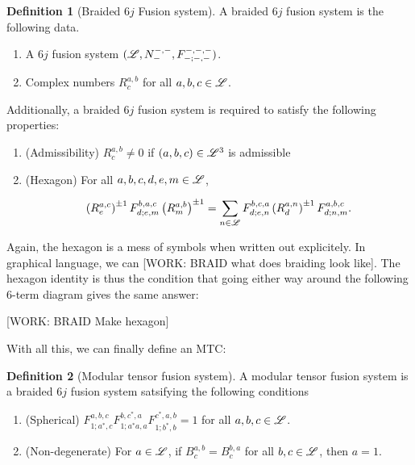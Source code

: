 \documentclass{article}
\theoremstyle{definition}
\newtheorem*{definition}{Definition}
\numberwithin{figure}{section}
\begin{document}
\begin{enumerate}[\thesection .1.]
\begin{definition}[Braided $6j$ Fusion system] A braided $6j$ fusion system is the following data.

\begin{enumerate}
\item A $6j$ fusion system $(\mathscr{L}, N_{\--}^{\--,\--},F^{\--,\--,\--}_{\--;\--,\--})$.
\item Complex numbers $R^{a,b}_{c}$ for all $a,b,c\in \mathscr{L}$.
\end{enumerate}

Additionally, a braided $6j$ fusion system is required to satisfy the following properties:

\begin{enumerate}

\item (Admissibility) $R^{a,b}_{c}\neq 0$ if $(a,b,c)\in \mathscr{L}^3$ is admissible

\item (Hexagon) For all $a,b,c,d,e,m\in\mathscr{L}$,

$$\left(R^{a,c}_{e}\right)^{\pm 1}F^{b,a,c}_{d;e,m}\left(R^{a,b}_{m}\right)^{\pm 1}=\sum_{n\in \mathscr{L}} F^{b,c,a}_{d;e,n}\left(R^{a,n}_{d}\right)^{\pm 1}F^{a,b,c}_{d;n,m}.$$
\end{enumerate}
\raggedleft\qedsymbol{}
\end{definition}

Again, the hexagon is a mess of symbols when written out explicitely. In graphical language, we can [WORK: BRAID what does braiding look like]. The hexagon identity is thus the condition that going either way around the following 6-term diagram gives the same answer:

[WORK: BRAID Make hexagon]

With all this, we can finally define an MTC:

\begin{definition}[Modular tensor fusion system] A modular tensor fusion system is a braided $6j$ fusion system satsifying the following conditions

\begin{enumerate}

\item (Spherical) $F^{a,b,c}_{1;a^*,c}F^{b,c^*,a}_{1;a^*a,a}F^{c^*,a,b}_{1;b^*,b}=1$ for all $a,b,c\in \mathscr{L}$.

\item (Non-degenerate) For $a\in \mathscr{L}$, if $B_c^{a,b}=B_c^{b,a}$ for all $b,c\in \mathscr{L}$, then $a=1$.
\end{enumerate}
\raggedleft\qedsymbol{}
\end{definition}


\end{enumerate}
\end{document}
